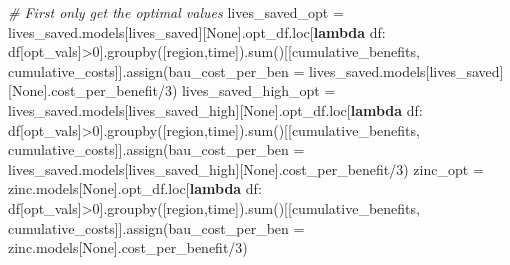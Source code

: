 \documentclass[
]{article}
\newenvironment{Shaded}{}{}
\newcommand{\BuiltInTok}[1]{#1}
\newcommand{\CommentTok}[1]{\textcolor[rgb]{0.38,0.63,0.69}{\textit{#1}}}
\newcommand{\DecValTok}[1]{\textcolor[rgb]{0.25,0.63,0.44}{#1}}
\newcommand{\KeywordTok}[1]{\textcolor[rgb]{0.00,0.44,0.13}{\textbf{#1}}}
\newcommand{\NormalTok}[1]{#1}
\newcommand{\OperatorTok}[1]{\textcolor[rgb]{0.40,0.40,0.40}{#1}}
\newcommand{\StringTok}[1]{\textcolor[rgb]{0.25,0.44,0.63}{#1}}
\newcommand{\VariableTok}[1]{\textcolor[rgb]{0.10,0.09,0.49}{#1}}
\begin{document}
\begin{Shaded}
\begin{Highlighting}[numbers=left,,]
\CommentTok{\# First only get the optimal values}
\NormalTok{lives\_saved\_opt }\OperatorTok{=}\NormalTok{ lives\_saved.models[}\StringTok{\textquotesingle{}lives\_saved\textquotesingle{}}\NormalTok{][}\VariableTok{None}\NormalTok{].opt\_df.loc[}\KeywordTok{lambda}\NormalTok{ df: df[}\StringTok{\textquotesingle{}opt\_vals\textquotesingle{}}\NormalTok{]}\OperatorTok{\textgreater{}}\DecValTok{0}\NormalTok{].groupby([}\StringTok{\textquotesingle{}region\textquotesingle{}}\NormalTok{,}\StringTok{\textquotesingle{}time\textquotesingle{}}\NormalTok{]).}\BuiltInTok{sum}\NormalTok{()[[}\StringTok{\textquotesingle{}cumulative\_benefits\textquotesingle{}}\NormalTok{, }\StringTok{\textquotesingle{}cumulative\_costs\textquotesingle{}}\NormalTok{]].assign(bau\_cost\_per\_ben }\OperatorTok{=}\NormalTok{  lives\_saved.models[}\StringTok{\textquotesingle{}lives\_saved\textquotesingle{}}\NormalTok{][}\VariableTok{None}\NormalTok{].cost\_per\_benefit}\OperatorTok{/}\DecValTok{3}\NormalTok{)}
\NormalTok{lives\_saved\_high\_opt }\OperatorTok{=}\NormalTok{ lives\_saved.models[}\StringTok{\textquotesingle{}lives\_saved\_high\textquotesingle{}}\NormalTok{][}\VariableTok{None}\NormalTok{].opt\_df.loc[}\KeywordTok{lambda}\NormalTok{ df: df[}\StringTok{\textquotesingle{}opt\_vals\textquotesingle{}}\NormalTok{]}\OperatorTok{\textgreater{}}\DecValTok{0}\NormalTok{].groupby([}\StringTok{\textquotesingle{}region\textquotesingle{}}\NormalTok{,}\StringTok{\textquotesingle{}time\textquotesingle{}}\NormalTok{]).}\BuiltInTok{sum}\NormalTok{()[[}\StringTok{\textquotesingle{}cumulative\_benefits\textquotesingle{}}\NormalTok{, }\StringTok{\textquotesingle{}cumulative\_costs\textquotesingle{}}\NormalTok{]].assign(bau\_cost\_per\_ben }\OperatorTok{=}\NormalTok{  lives\_saved.models[}\StringTok{\textquotesingle{}lives\_saved\_high\textquotesingle{}}\NormalTok{][}\VariableTok{None}\NormalTok{].cost\_per\_benefit}\OperatorTok{/}\DecValTok{3}\NormalTok{)}
\NormalTok{zinc\_opt }\OperatorTok{=}\NormalTok{ zinc.models[}\VariableTok{None}\NormalTok{].opt\_df.loc[}\KeywordTok{lambda}\NormalTok{ df: df[}\StringTok{\textquotesingle{}opt\_vals\textquotesingle{}}\NormalTok{]}\OperatorTok{\textgreater{}}\DecValTok{0}\NormalTok{].groupby([}\StringTok{\textquotesingle{}region\textquotesingle{}}\NormalTok{,}\StringTok{\textquotesingle{}time\textquotesingle{}}\NormalTok{]).}\BuiltInTok{sum}\NormalTok{()[[}\StringTok{\textquotesingle{}cumulative\_benefits\textquotesingle{}}\NormalTok{, }\StringTok{\textquotesingle{}cumulative\_costs\textquotesingle{}}\NormalTok{]].assign(bau\_cost\_per\_ben }\OperatorTok{=}\NormalTok{  zinc.models[}\VariableTok{None}\NormalTok{].cost\_per\_benefit}\OperatorTok{/}\DecValTok{3}\NormalTok{)}

\end{Highlighting}
\end{Shaded}
\end{document}
